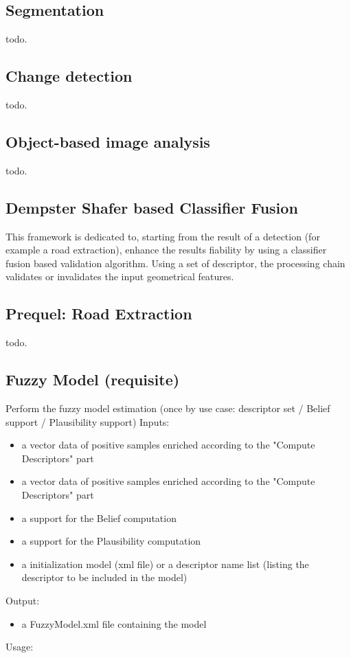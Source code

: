 \subsection{Segmentation}\label{ssec:segmentation}

todo.

\subsection{Change detection}\label{ssec:changedetection}

todo.

\subsection{Object-based image analysis}\label{ssec:obia}

todo.

\subsection{Dempster Shafer based Classifier Fusion}\label{ssec:classifierfusion}

This framework is dedicated to, starting from the result of a detection (for example a road extraction), enhance the results fiability by using a classifier fusion based validation algorithm. Using a set of descriptor, the processing chain validates or invalidates the input geometrical features.

\subsection{Prequel: Road Extraction}

todo.

\subsection{Fuzzy Model (requisite)}

Perform the fuzzy model estimation (once by use case: descriptor set / Belief support / Plausibility support)
Inputs:
\begin{itemize}
\item a vector data of positive samples enriched according to the "Compute Descriptors" part
\item a vector data of positive samples enriched according to the "Compute Descriptors" part
\item a support for the Belief computation
\item a support for the Plausibility computation
\item a initialization model (xml file) or a descriptor name list (listing the descriptor to be included in the model)
\end{itemize}
Output:
\begin{itemize}
\item a FuzzyModel.xml file containing the model
\end{itemize}
Usage:

